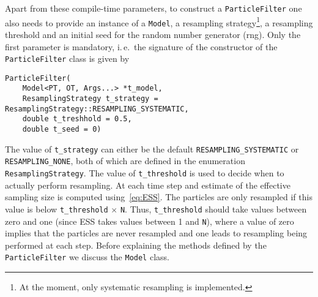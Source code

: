 Apart from these compile-time parameters, to construct a
\texttt{ParticleFilter} one also needs to provide an instance of a
\texttt{Model}, a resampling strategy\footnote{At the moment, only
  systematic resampling is implemented.}, a resampling threshold and
an initial seed for the random number generator (rng). Only the first
parameter is mandatory, i.\,e.\ the signature of the constructor of
the \texttt{ParticleFilter} class is given by
\begin{verbatim}
ParticleFilter(
    Model<PT, OT, Args...> *t_model,
    ResamplingStrategy t_strategy = ResamplingStrategy::RESAMPLING_SYSTEMATIC,
    double t_treshhold = 0.5, 
    double t_seed = 0)
\end{verbatim}
The value of \texttt{t\_strategy} can either be the default
\texttt{RESAMPLING\_SYSTEMATIC} or \texttt{RESAMPLING\_NONE}, both of
which are defined in the enumeration \texttt{ResamplingStrategy}. The
value of \texttt{t\_threshold} is used to decide when to actually
perform resampling. At each time step and estimate of the effective
sampling size is computed using~\eqref{eq:ESS}. The particles are only
resampled if this value is below \texttt{t\_threshold} $\times$
\texttt{N}. Thus, \texttt{t\_threshold} should take values between
zero and one (since ESS takes values between 1 and \texttt{N}), where
a value of zero implies that the particles are never resampled and one
leads to resampling being performed at each step. Before explaining
the methods defined by the \texttt{ParticleFilter} we discuss the
\texttt{Model} class.

